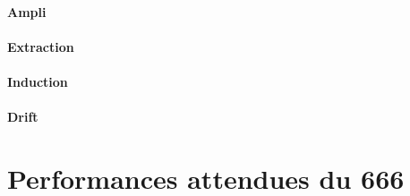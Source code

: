         \paragraph{Ampli}
        \paragraph{Extraction}
        \paragraph{Induction}
        \paragraph{Drift}
    
    \section{Performances attendues du 666}

\FloatBarrier

\printbibliography